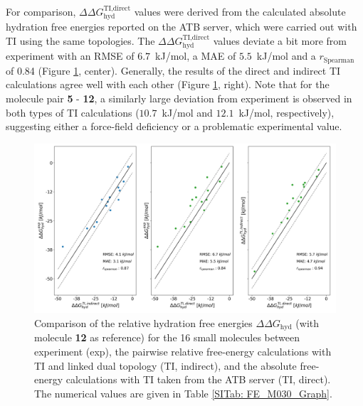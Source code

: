 \FloatBarrier
\clearpage
For comparison, $\Delta \Delta G_{\text{hyd}}^\text{TI,direct}$ values were derived from the calculated absolute hydration free energies reported on the ATB server,\cite{Stroet2018} which were carried out with TI using the same topologies. The $\Delta \Delta G_{\text{hyd}}^\text{TI,direct}$ values deviate a bit more from experiment with an RMSE of $6.7$~kJ/mol, a MAE of $5.5$~kJ/mol and a $r_{\text{Spearman}}$ of 0.84 (Figure \ref{fig: pairCorr}, center).
Generally, the results of the direct\cite{Stroet2018} and indirect TI calculations agree well with each other (Figure \ref{fig: pairCorr}, right). Note that for the molecule pair \textbf{5} - \textbf{12}, a similarly large deviation from experiment is observed in both types of TI calculations ($10.7$~kJ/mol and $12.1$~kJ/mol, respectively), suggesting either a force-field deficiency or a problematic experimental value.

\begin{figure}[h!]
    \centering
    \includegraphics[width=\textwidth]{fig/results/pairwise/FE/M030_graph_ddG_solv_correlation_ATB_TI.png}
    \caption{Comparison of the relative hydration free energies $\Delta \Delta G_{\text{hyd}}$ (with molecule \textbf{12} as reference) for the 16 small molecules between experiment (exp), the pairwise relative free-energy calculations with TI and linked dual topology (TI, indirect), and the absolute free-energy calculations with TI taken from the ATB server\cite{Stroet2018} (TI, direct). The numerical values are given in Table \ref{SITab: FE_M030_Graph}.} 
    \label{fig: pairCorr}
\end{figure}



